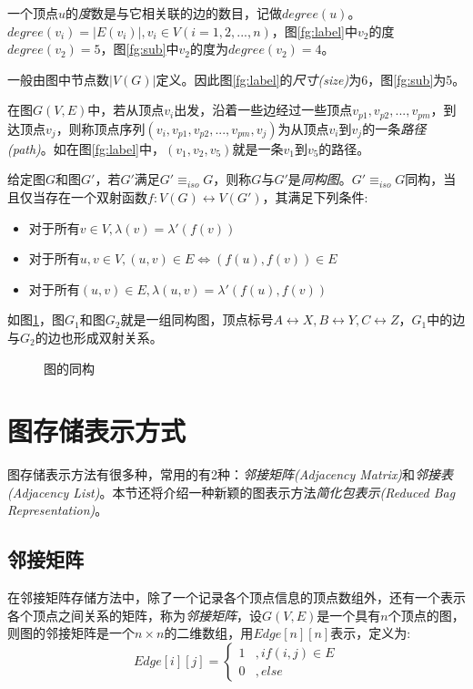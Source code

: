 \documentclass{XDBAthesis}
\begin{document}
\begin{defn}[顶点的度]\cite{GraphAlgorithm}
    一个顶点$u$的\emph{度}数是与它相关联的边的数目，记做$degree(u)$。$degree(v_i )=|E(v_i )|,v_i \in V(i=1,2,...,n)$，图\ref{fg:label}中$v_2 $的度$degree(v_2 )=5$，图\ref{fg:sub}中$v_2 $的度为$degree(v_2)=4$。
\end{defn}
\begin{defn}[图的尺寸]\cite{g13}
    一般由图中节点数$|V(G)|$定义。因此图\ref{fg:label}的\emph{尺寸(size)}为6，图\ref{fg:sub}为5。
\end{defn}
\begin{defn}[路径]\cite{GraphAlgorithm}
在图$G(V,E)$中，若从顶点$v_i$出发，沿着一些边经过一些顶点$v_{p1},v_{p2},...,v_{pm}$，到达顶点$v_j $，则称顶点序列$(v_{i},v_{p1},v_{p2},...,v_{pm},v_{j})$为从顶点$v_i $到$v_j $的一条\emph{路径(path)}。如在图\ref{fg:label}中，$(v_{1},v_{2},v_{5})$就是一条$v_1 $到$v_5 $的路径。  
\end{defn}
\begin{defn}[图的同构]\cite{g13}
给定图$G$和图$G'$，若$G'$满足$G'\equiv_{iso}G$，则称$G$与$G'$是\emph{同构图}。$G'\equiv_{iso}G$同构，当且仅当存在一个双射函数$f:V(G)\leftrightarrow V(G')$，其满足下列条件:
\begin{itemize}
    \item 对于所有$v\in V,\lambda(v)=\lambda '(f(v))$
    \item 对于所有$u,v\in V,(u,v)\in E\Leftrightarrow (f(u),f(v))\in E$
    \item 对于所有$(u,v)\in E,\lambda(u,v)=\lambda '(f(u),f(v)) $
\end{itemize}  
\end{defn}
如图\ref{fg:iso}，图$G_1$和图$G_2$就是一组同构图，顶点标号$A\leftrightarrow X,B\leftrightarrow Y,C\leftrightarrow Z$，$G_1$中的边与$G_2$的边也形成双射关系。
\begin{figure}[htb]
    \centering
    \subfigure[$G_1$]{
        
    }
    \subfigure[$G_2$]{
        
    }
    \caption{图的同构}
    \label{fg:iso}
\end{figure}

\section{图存储表示方式}
图存储表示方法有很多种，常用的有2种：\emph{邻接矩阵(Adjacency Matrix)}和\emph{邻接表(Adjacency List)}。本节还将介绍一种新颖的图表示方法\emph{简化包表示(Reduced Bag Representation)}\cite{ghash}。
\subsection{邻接矩阵}
 在邻接矩阵存储方法中，除了一个记录各个顶点信息的顶点数组外，还有一个表示各个顶点之间关系的矩阵，称为\emph{邻接矩阵}\cite{GraphAlgorithm}，设$G(V,E)$是一个具有$n$个顶点的图，则图的邻接矩阵是一个$n\times n$的二维数组，用$Edge[n][n]$表示，定义为:
\begin{equation}
    Edge[i][j]=\left\{
    \begin{aligned}
        1 & , if (i,j)\in E \\
        0 & , else    
    \end{aligned}\right. 
\end{equation}
\end{document}
